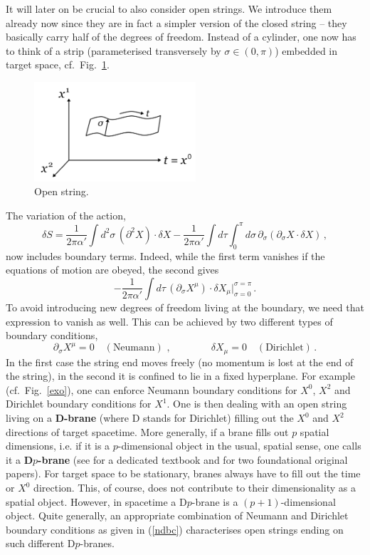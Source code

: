 \documentclass[12pt]{article}
\newcommand{\be}{\begin{equation}}
\newcommand{\ee}{\end{equation}}
\numberwithin{equation}{section}
\begin{document}
It will later on be crucial to also consider open strings. We introduce them already now since they are in fact a simpler version of the closed string -- they basically carry half of the degrees of freedom. Instead of a cylinder, one now has to think of a strip (parameterised transversely by $\sigma\in (0,\pi)$) embedded in target space, cf.~Fig.~\ref{ops}. 

\begin{figure}[ht]
\begin{center} 
\includegraphics[width=6cm]{ops.png}
\caption{Open string.}
\label{ops} 
\end{center}
\end{figure}

The variation of the action,
\be
\delta S=\frac{1}{2\pi\alpha'}\int d^2\sigma\,(\partial^2 X)\cdot\delta X-\frac{1}{2\pi\alpha'}\int d\tau\int_0^\pi d\sigma\,\partial_\sigma(\partial_\sigma X\cdot\delta X)\,,
\ee
now includes boundary terms. Indeed, while the first term vanishes if the equations of motion are obeyed, the second gives
\be
-\frac{1}{2\pi\alpha'}\int d\tau\,(\partial_\sigma X^\mu)\cdot \delta X_\mu \Big|^{\sigma=\pi}_{\sigma=0}\,.
\ee
To avoid introducing new degrees of freedom living at the boundary, we need that expression to vanish as well. This can be achieved by two different types of boundary conditions,
\be
\partial_\sigma X^\mu=0\quad (\mbox{Neumann})\,\,,\qquad\qquad \delta X_\mu=0\quad (\mbox{Dirichlet})\,.
\label{ndbc}
\ee
In the first case the string end moves freely (no momentum is lost at the end of the string), in the second it is confined to lie in a fixed hyperplane. For example (cf.~Fig.~\ref{exo}), one can enforce Neumann boundary conditions for $X^0$, $X^2$ and Dirichlet boundary conditions for $X^1$. One is then dealing with an open string living on a {\bf D-brane} (where D stands for Dirichlet) filling out the $X^0$ and $X^2$ directions of target spacetime. More generally, if a brane fills out $p$ spatial dimensions, i.e. if it is a $p$-dimensional object in the usual, spatial sense, one calls it a {\bf D$p$-brane}
(see \cite{Johnson:2000ch} for a dedicated textbook and \cite{Dai:1989ua, Leigh:1989jq} for two foundational original papers). For target space to be stationary, branes always have to fill out the time or $X^0$ direction. This, of course, does not contribute to their dimensionality as a spatial object. However, in spacetime a D$p$-brane is a $(p+1)$-dimensional object. Quite generally, an appropriate combination of Neumann and Dirichlet boundary conditions as given in (\ref{ndbc}) characterises open strings ending on such different D$p$-branes.
\end{document}
